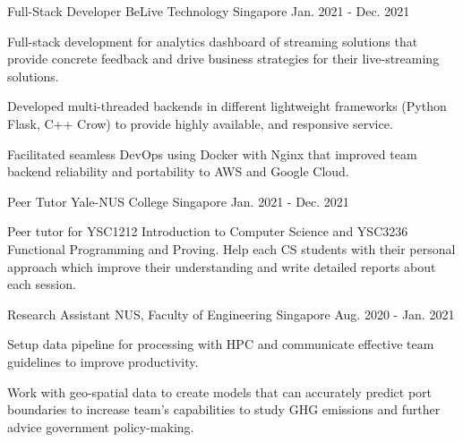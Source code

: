 \begin{cventries}
  \cventry
    {Full-Stack Developer} %
    {BeLive Technology} %
    {Singapore} %
    {Jan. 2021 - Dec. 2021} %
    {
      \begin{cvitems} %
        \item {Full-stack development for analytics dashboard of streaming solutions that provide concrete feedback and drive business strategies for their live-streaming solutions.}
        \item {Developed multi-threaded backends in different lightweight frameworks (Python Flask, C++ Crow) to provide highly available, and responsive service.}
        \item {Facilitated seamless DevOps using Docker with Nginx that improved team backend reliability and portability to AWS and Google Cloud.}
      \end{cvitems}
    }

  \cventry
    {Peer Tutor} %
    {Yale-NUS College} %
    {Singapore} %
    {Jan. 2021 - Dec. 2021} %
    {
      \begin{cvitems} %
        \item {Peer tutor for YSC1212 Introduction to Computer Science and YSC3236 Functional Programming and Proving.  Help each CS students with their personal approach which improve their understanding and write detailed reports about each session.}
      \end{cvitems}
    }
    
  \cventry
    {Research Assistant} %
    {NUS, Faculty of Engineering} %
    {Singapore} %
    {Aug. 2020 - Jan. 2021} %
    {
      \begin{cvitems} %
        \item {Setup data pipeline for processing with HPC and communicate effective team guidelines to improve productivity.}
        \item {Work with geo-spatial data to create models that can accurately predict port boundaries to increase team’s capabilities to study GHG emissions and further advice government policy-making.}
      \end{cvitems}
    }
    

\end{cventries}
